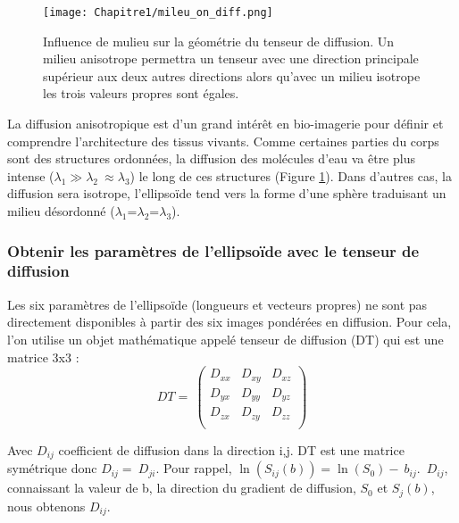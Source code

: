 \begin{figure}[!htbp]
  \begin{center}
    \texttt{[image: Chapitre1/mileu\_on\_diff.png]}
     \end{center}
    \caption{Influence de mulieu sur la géométrie du tenseur de diffusion. Un milieu anisotrope permettra un tenseur avec une direction principale supérieur aux deux autres directions alors qu'avec un milieu isotrope les trois valeurs propres sont égales.}
  \label{fig:diff_avec_milieu}
\end{figure}
La diffusion anisotropique est d’un grand intérêt en bio-imagerie pour définir et comprendre l’architecture des tissus vivants. Comme certaines parties du corps sont des structures ordonnées, la diffusion des molécules d’eau va être plus intense ($\lambda_1\gg\lambda_2\ \approx\lambda_3$) le long de ces structures (Figure \ref{fig:diff_avec_milieu}). Dans d’autres cas, la diffusion sera isotrope, l’ellipsoïde tend vers la forme d’une sphère traduisant un milieu désordonné ($\lambda_1$=$\lambda_2$=$\lambda_3$).

\clearpage
\subsubsection{Obtenir les paramètres de l’ellipsoïde avec le tenseur de diffusion}

Les six paramètres de l’ellipsoïde (longueurs et vecteurs propres) ne sont pas directement disponibles à partir des six images pondérées en diffusion. Pour cela, l’on utilise un objet mathématique appelé tenseur de diffusion (DT) qui est une matrice 3x3 \cite{Basser1994}:
\begin{equation}
\nonumber
DT=\ \left(\begin{matrix}D_{xx}&D_{xy}&D_{xz}\\D_{yx}&D_{yy}&D_{yz}\\D_{zx}&D_{zy}&D_{zz}\\\end{matrix}\right)
\end{equation}


Avec $D_{ij}$ coefficient de diffusion dans la direction i,j. DT est une matrice symétrique donc $D_{ij}=\ D_{ji}$. Pour rappel, $\ln{\left(S_{ij}\left(b\right)\right)=}\ln{\left(S_0\right)}-\ b_{ij}$.\ $D_{ij}$, connaissant la valeur de b, la direction du gradient de diffusion, $S_0$ et $S_{j}(b)$, nous obtenons $D_{ij}$.


